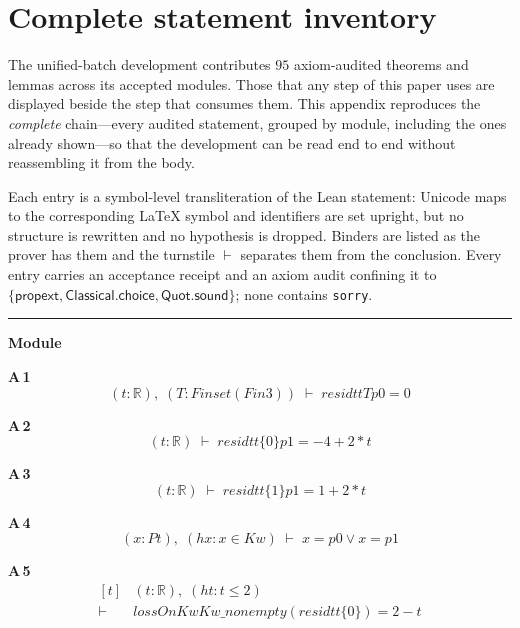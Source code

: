 \appendices
\section{Complete statement inventory}
\label{app:inventory}

The unified-batch development contributes $95$ axiom-audited theorems and lemmas across its accepted modules. Those that any step of this paper uses are displayed beside the step that consumes them. This appendix reproduces the \emph{complete} chain---every audited statement, grouped by module, including the ones already shown---so that the development can be read end to end without reassembling it from the body.

Each entry is a symbol-level transliteration of the Lean statement: Unicode maps to the corresponding \LaTeX{} symbol and identifiers are set upright, but no structure is rewritten and no hypothesis is dropped. Binders are listed as the prover has them and the turnstile $\vdash$ separates them from the conclusion. Every entry carries an acceptance receipt and an axiom audit confining it to $\{\textsf{propext},\textsf{Classical.choice},\textsf{Quot.sound}\}$; none contains \texttt{sorry}.

\vspace{4pt}\noindent\rule{\columnwidth}{0.4pt}\par\vspace{2pt}
\noindent\textbf{Module }\par\vspace{3pt}

\noindent\textbf{A\,1}\quad{}
{\footnotesize\[ (\mathit{t} : \mathbb{R} ),\; (\mathit{T} : \mathit{Finset} (\mathit{Fin} 3)) \;\vdash\; \mathit{residt} \mathit{t} \mathit{T} \mathit{p0} = 0 \]}

\noindent\textbf{A\,2}\quad{}
{\footnotesize\[ (\mathit{t} : \mathbb{R} ) \;\vdash\; \mathit{residt} \mathit{t} \{ 0\} \mathit{p1} = -4 + 2 * \mathit{t} \]}

\noindent\textbf{A\,3}\quad{}
{\footnotesize\[ (\mathit{t} : \mathbb{R} ) \;\vdash\; \mathit{residt} \mathit{t} \{ 1\} \mathit{p1} = 1 + 2 * \mathit{t} \]}

\noindent\textbf{A\,4}\quad{}
{\footnotesize\[ (\mathit{x} : \mathit{Pt}),\; (\mathit{hx} : \mathit{x} \in \mathit{Kw}) \;\vdash\; \mathit{x} = \mathit{p0} \vee \mathit{x} = \mathit{p1} \]}

\noindent\textbf{A\,5}\quad{}
{\footnotesize\[ \begin{aligned}[t]
&(\mathit{t} : \mathbb{R} ),\; (\mathit{ht} : \mathit{t} \leq 2)\\
\vdash\;&\mathit{lossOn} \mathit{Kw} \mathit{Kw\_nonempty} (\mathit{residt} \mathit{t} \{ 0\} ) = 2 - \mathit{t}
\end{aligned} \]}

